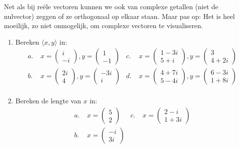 \documentclass[../../main.tex]{subfiles}
\begin{document}
Net als bij reële vectoren kunnen we ook van complexe getallen (niet de nulvector) zeggen of ze orthogonaal op elkaar staan. Maar pas op: Het is heel moeilijk, zo niet onmogelijk, om complexe vectoren te visualiseren. 

\begin{opdrachtlang}
\begin{enumerate}
    \item Bereken $\langle x,y\rangle$ in:
     \begin{align*}
        a.\;& x=\begin{pmatrix}i\\-i\end{pmatrix}, y=\begin{pmatrix}1\\-1\end{pmatrix}
        & c.\;& x=\begin{pmatrix}1-3i\\5+i\end{pmatrix}, y=\begin{pmatrix}3\\4+2i\end{pmatrix}\\
        b.\;& x=\begin{pmatrix}2i\\4\end{pmatrix}, y=\begin{pmatrix}-3i\\i\end{pmatrix}
        & d.\;& x=\begin{pmatrix}4+7i\\5-4i\end{pmatrix}, y=\begin{pmatrix}6-3i\\1+8i\end{pmatrix}\\
    \end{align*}
    \item Bereken de lengte van $x$ in:
     \begin{align*}
        a.\;& x=\begin{pmatrix}5\\2\end{pmatrix}
        & c.\;& x=\begin{pmatrix}2-i\\1+3i\end{pmatrix}\\
        b.\;& x=\begin{pmatrix}-i\\3i\end{pmatrix}

\end{align*}
\end{enumerate}
\end{opdrachtlang}
\end{document}
